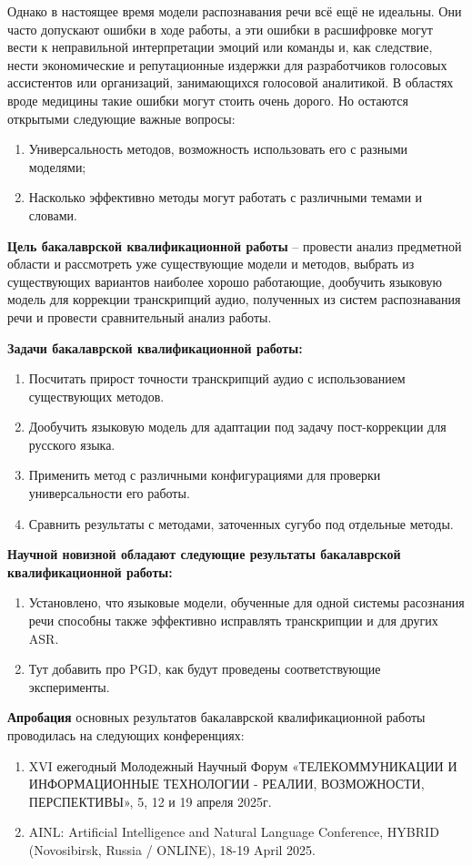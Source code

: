 Однако в настоящее время модели распознавания речи всё ещё не идеальны.
Они часто допускают ошибки в ходе работы, а эти ошибки в расшифровке могут вести к неправильной интерпретации эмоций или команды и, как следствие, нести экономические и репутационные издержки для разработчиков голосовых ассистентов или организаций, занимающихся голосовой аналитикой.
В областях вроде медицины такие ошибки могут стоить очень дорого.
Но остаются открытыми следующие важные вопросы:
\begin{enumerate}
\item Универсальность методов, возможность использовать его с разными моделями;
\item Насколько эффективно методы могут работать с различными темами и словами.
\end{enumerate}

\newpage

\textbf{Цель бакалаврской квалификационной работы} -- провести анализ предметной области и рассмотреть уже существующие модели и методов, выбрать из существующих вариантов наиболее хорошо работающие, дообучить языковую модель для коррекции транскрипций аудио, полученных из систем распознавания речи и провести сравнительный анализ работы.

\textbf{Задачи бакалаврской квалификационной работы:}
\begin{enumerate}
\item Посчитать прирост точности транскрипций аудио с использованием существующих методов. 
\item Дообучить языковую модель для адаптации под задачу пост-коррекции для русского языка.
\item Применить метод с различными конфигурациями для проверки универсальности его работы. 
\item Сравнить результаты с методами, заточенных сугубо под отдельные методы.
\end{enumerate}


\textbf{Научной новизной обладают следующие результаты бакалаврской
  квалификационной работы:}
\begin{enumerate}
\item Установлено, что языковые модели, обученные для одной системы расознания речи способны также эффективно исправлять транскрипции и для других ASR.
\item Тут добавить про PGD, как будут проведены соответствующие эксперименты.
\end{enumerate}


\textbf{Апробация} основных результатов бакалаврской квалификационной работы проводилась на следующих конференциях:
\begin{enumerate}
  \item XVI ежегодный Молодежный Научный Форум «ТЕЛЕКОММУНИКАЦИИ И ИНФОРМАЦИОННЫЕ ТЕХНОЛОГИИ - РЕАЛИИ, ВОЗМОЖНОСТИ, ПЕРСПЕКТИВЫ», 5, 12 и 19 апреля 2025г.
  \item AINL: Artificial Intelligence and Natural Language Conference, HYBRID (Novosibirsk, Russia / ONLINE), 18-19 April 2025.
\end{enumerate}
